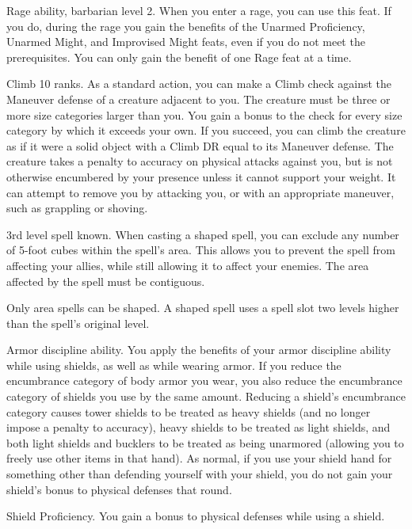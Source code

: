 \featpres Rage ability, barbarian level 2.
\featben When you enter a rage, you can use this feat.
If you do, during the rage you gain the benefits of the Unarmed Proficiency, Unarmed Might, and Improvised Might feats, even if you do not meet the prerequisites.
 You can only gain the benefit of one Rage feat at a time.

\featpre Climb 10 ranks.
\featben As a standard action, you can make a Climb check against the Maneuver defense of a creature adjacent to you.
The creature must be three or more size categories larger than you.
You gain a  bonus to the check for every size category by which it exceeds your own.
If you succeed, you can climb the creature as if it were a solid object with a Climb DR equal to its Maneuver defense.
The creature takes a  penalty to accuracy on physical attacks against you, but is not otherwise encumbered by your presence unless it cannot support your weight.
It can attempt to remove you by attacking you, or with an appropriate maneuver, such as grappling or shoving.

\featpre 3rd level spell known.
\featben When casting a shaped spell, you can exclude any number of 5-foot cubes within the spell's area.
This allows you to prevent the spell from affecting your allies, while still allowing it to affect your enemies.
The area affected by the spell must be contiguous.

Only area spells can be shaped.
A shaped spell uses a spell slot two levels higher than the spell's original level.

\featpre Armor discipline ability.
\featben You apply the benefits of your armor discipline ability while using shields, as well as while wearing armor.
If you reduce the encumbrance category of body armor you wear, you also reduce the encumbrance category of shields you use by the same amount.
Reducing a shield's encumbrance category causes tower shields to be treated as heavy shields (and no longer impose a  penalty to accuracy), heavy shields to be treated as light shields, and both light shields and bucklers to be treated as being unarmored (allowing you to freely use other items in that hand).
As normal, if you use your shield hand for something other than defending yourself with your shield, you do not gain your shield's bonus to physical defenses that round.

\featpre Shield Proficiency.
\featben You gain a  bonus to physical defenses while using a shield.

